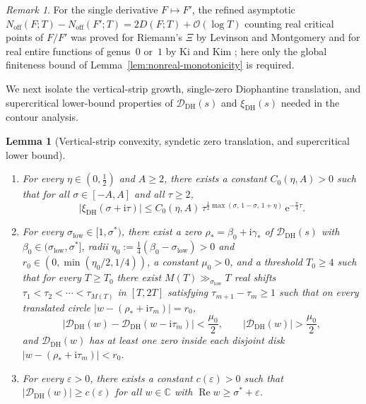 \documentclass[11pt,a4paper,reqno]{amsart}
\newtheorem{lemma}[theorem]{Lemma}
\theoremstyle{definition}
\theoremstyle{remark}
\newtheorem{remark}[theorem]{Remark}
\numberwithin{equation}{section}
\newcommand{\C}{\mathbb{C}}
\newcommand{\ii}{\mathrm{i}}
\newcommand{\ee}{\mathrm{e}}
\DeclareMathOperator{\Reop}{Re}
\begin{document}
\begin{remark}
\label{rem:kikim-credit}
For the single derivative $F \mapsto F'$, the refined asymptotic $N_{\mathrm{off}}(F;T) - N_{\mathrm{off}}(F';T) = 2D(F;T) + \mathcal{O}(\log T)$ counting real critical points of $F/F'$ was proved for Riemann's $\Xi$ by Levinson and Montgomery \cite{levinson1974} and for real entire functions of genus~$0$ or~$1$ by Ki and Kim \cite{kikim2000}; here only the global finiteness bound of Lemma~\ref{lem:nonreal-monotonicity} is required.
\end{remark}

We next isolate the vertical-strip growth, single-zero Diophantine translation, and supercritical lower-bound properties of $\mathcal{D}_{\mathrm{DH}}(s)$ and $\xi_{\mathrm{DH}}(s)$ needed in the contour analysis.

\begin{lemma}[Vertical-strip convexity, syndetic zero translation, and supercritical lower bound]
\label{lem:dirichlet-analytic}
\leavevmode
\begin{enumerate}[label=\textup{(\roman*)},leftmargin=2.0em]
  \item For every $\eta \in (0, \frac{1}{2})$ and $A \ge 2$, there exists a constant $C_0(\eta, A) > 0$ such that for all $\sigma \in [-A, A]$ and all $\tau \ge 2$,
  \begin{equation}
    \bigl|\xi_{\mathrm{DH}}(\sigma + \ii\tau)\bigr|
    \le C_0(\eta, A)\,\tau^{\frac{1}{2}\max(\sigma,\, 1-\sigma,\, 1+\eta)}\,\ee^{-\frac{\pi}{4}\tau}.
    \label{eq:xi-convexity}
  \end{equation}
  \item For every $\sigma_{\mathrm{low}} \in [1, \sigma^*)$, there exist a zero $\rho_* = \beta_0 + \ii\gamma_*$ of $\mathcal{D}_{\mathrm{DH}}(s)$ with $\beta_0 \in (\sigma_{\mathrm{low}}, \sigma^*]$, radii $\eta_0 := \frac{1}{4}(\beta_0 - \sigma_{\mathrm{low}}) > 0$ and $r_0 \in (0, \min(\eta_0/2, 1/4))$, a constant $\mu_0 > 0$, and a threshold $T_0 \ge 4$ such that for every $T \ge T_0$ there exist $M(T) \gg_{\sigma_{\mathrm{low}}} T$ real shifts $\tau_1 < \tau_2 < \cdots < \tau_{M(T)}$ in $[T, 2T]$ satisfying $\tau_{m+1} - \tau_m \ge 1$ such that on every translated circle $|w - (\rho_* + \ii\tau_m)| = r_0$,
  \begin{equation}
    \bigl|\mathcal{D}_{\mathrm{DH}}(w) - \mathcal{D}_{\mathrm{DH}}(w - \ii\tau_m)\bigr| < \frac{\mu_0}{2},
    \qquad
    \bigl|\mathcal{D}_{\mathrm{DH}}(w)\bigr| > \frac{\mu_0}{2},
    \label{eq:syndetic-rouche}
  \end{equation}
  and $\mathcal{D}_{\mathrm{DH}}(w)$ has at least one zero inside each disjoint disk $|w - (\rho_* + \ii\tau_m)| < r_0$.
  \item For every $\varepsilon > 0$, there exists a constant $c(\varepsilon) > 0$ such that $|\mathcal{D}_{\mathrm{DH}}(w)| \ge c(\varepsilon)$ for all $w \in \C$ with $\Reop w \ge \sigma^* + \varepsilon$.
\end{enumerate}
\end{lemma}
\end{document}
